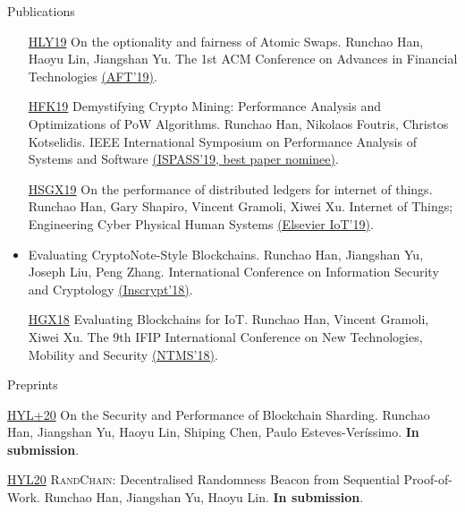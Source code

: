\documentclass{resume} %
\begin{document}
\begin{rSection}{Publications}
\begin{itemize}
        \item[\href{https://eprint.iacr.org/2019/896}{HLY19}] On the optionality and fairness of Atomic Swaps. Runchao Han, Haoyu Lin, Jiangshan Yu. The 1st ACM Conference on Advances in Financial Technologies \href{https://dl.acm.org/doi/10.1145/3318041.3355460}{(AFT'19)}.
        \item[\href{https://www.research.manchester.ac.uk/portal/files/85753741/paper.pdf}{HFK19}] Demystifying Crypto Mining: Performance Analysis and Optimizations of PoW Algorithms. Runchao Han, Nikolaos Foutris, Christos Kotselidis. IEEE International Symposium on Performance Analysis of Systems and Software \href{https://ieeexplore.ieee.org/document/8695663}{(ISPASS'19, best paper nominee)}.
        \item[\href{https://gramoli.redbellyblockchain.io/web/doc/pubs/IoT2019.pdf}{HSGX19}] On the performance of distributed ledgers for internet of things. Runchao Han, Gary Shapiro, Vincent Gramoli, Xiwei Xu. Internet of Things; Engineering Cyber Physical Human Systems \href{https://www.sciencedirect.com/science/article/abs/pii/S2542660518300416}{(Elsevier IoT'19)}.
        \item[\href{https://www.researchgate.net/profile/Runchao_Han/publication/331227984_Evaluating_CryptoNote-Style_Blockchains_14th_International_Conference_Inscrypt_2018_Fuzhou_China_December_14-17_2018_Revised_Selected_Papers/links/5c747901299bf1268d25a5f5/Evaluating-CryptoNote-Style-Blockchains-14th-International-Conference-Inscrypt-2018-Fuzhou-China-December-14-17-2018-Revised-Selected-Papers.pdf}{HYLZ18}] Evaluating CryptoNote-Style Blockchains. Runchao Han, Jiangshan Yu, Joseph Liu, Peng Zhang. International Conference on Information Security and Cryptology \href{https://link.springer.com/chapter/10.1007/978-3-030-14234-6_2}{(Inscrypt'18)}.
        \item[\href{https://gramoli.redbellyblockchain.io/web/doc/pubs2/blockchain-iot.pdf}{HGX18}] Evaluating Blockchains for IoT. Runchao Han, Vincent Gramoli, Xiwei Xu. The 9th IFIP International Conference on New Technologies, Mobility and Security \href{https://ieeexplore.ieee.org/document/8328736}{(NTMS'18)}.
    \end{itemize}

\end{rSection}


\begin{rSection}{Preprints}
    \item[\href{https://eprint.iacr.org/2020/1033}{HYL+20}] On the Security and Performance of Blockchain Sharding. Runchao Han, Jiangshan Yu, Haoyu Lin, Shiping Chen, Paulo Esteves-Veríssimo. \textbf{In submission}.
    \item[\href{https://eprint.iacr.org/2020/1033}{HYL20}] \textsc{RandChain}: Decentralised Randomness Beacon from Sequential Proof-of-Work. Runchao Han, Jiangshan Yu, Haoyu Lin. \textbf{In submission}.
\end{rSection}
\end{document}
